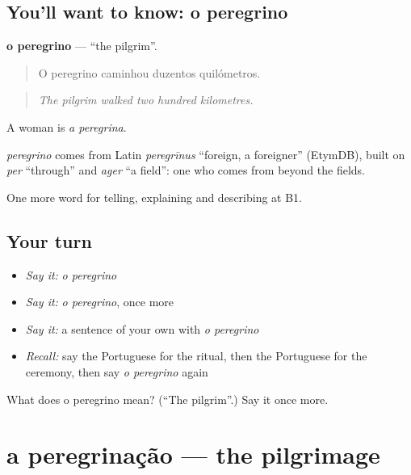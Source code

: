 \subsection*{You'll want to know: o peregrino}
\textbf{o peregrino} — \textquotedblleft{}the pilgrim\textquotedblright{}.

\begin{quote}
O peregrino caminhou duzentos quilómetros.
\end{quote}

\begin{quote}
\emph{The pilgrim walked two hundred kilometres.}
\end{quote}

A woman is \emph{a peregrina}.

\begin{cousinweb}
\emph{peregrino} comes from Latin \emph{peregrīnus} \textquotedblleft{}foreign, a foreigner\textquotedblright{} (EtymDB), built on \emph{per} \textquotedblleft{}through\textquotedblright{} and \emph{ager} \textquotedblleft{}a field\textquotedblright{}: one who comes from beyond the fields.
\end{cousinweb}

\begin{grammarlens}[title={What you've built}]
One more word for telling, explaining and describing at B1.
\end{grammarlens}

\subsection*{Your turn}
\begin{itemize}
\raggedright
  \item \emph{Say it:} \emph{o peregrino}
  \item \emph{Say it:} \emph{o peregrino}, once more
  \item \emph{Say it:} a sentence of your own with \emph{o peregrino}
  \item \emph{Recall:} say the Portuguese for the ritual, then the Portuguese for the ceremony, then say \emph{o peregrino} again
\end{itemize}

\begin{tcolorbox}[breakable,colback=teal!4,colframe=teal!35!black,title={Before you move on}]
What does o peregrino mean? (\textquotedblleft{}The pilgrim\textquotedblright{}.) Say it once more.
\end{tcolorbox}
\section[a peregrinação]{a peregrinação — the pilgrimage}

